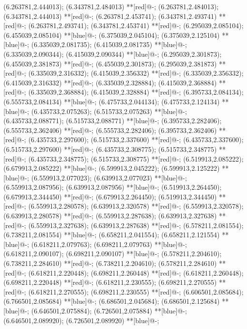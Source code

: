 (6.263781,2.444013); (6.343781,2.484013) **[red]@{-};
(6.263781,2.484013); (6.343781,2.444013) **[red]@{-};
(6.263781,2.453741); (6.343781,2.493741) **[red]@{-};
(6.263781,2.493741); (6.343781,2.453741) **[red]@{-};
(6.295039,2.085104); (6.455039,2.085104) **[blue]@{-};
(6.375039,2.045104); (6.375039,2.125104) **[blue]@{-};
(6.335039,2.081735); (6.415039,2.081735) **[blue]@{-};
(6.335039,2.090344); (6.415039,2.090344) **[blue]@{-};
(6.295039,2.301873); (6.455039,2.381873) **[red]@{-};
(6.455039,2.301873); (6.295039,2.381873) **[red]@{-};
(6.335039,2.316332); (6.415039,2.356332) **[red]@{-};
(6.335039,2.356332); (6.415039,2.316332) **[red]@{-};
(6.335039,2.328884); (6.415039,2.368884) **[red]@{-};
(6.335039,2.368884); (6.415039,2.328884) **[red]@{-};
(6.395733,2.084134); (6.555733,2.084134) **[blue]@{-};
(6.475733,2.044134); (6.475733,2.124134) **[blue]@{-};
(6.435733,2.075263); (6.515733,2.075263) **[blue]@{-};
(6.435733,2.088771); (6.515733,2.088771) **[blue]@{-};
(6.395733,2.282406); (6.555733,2.362406) **[red]@{-};
(6.555733,2.282406); (6.395733,2.362406) **[red]@{-};
(6.435733,2.297600); (6.515733,2.337600) **[red]@{-};
(6.435733,2.337600); (6.515733,2.297600) **[red]@{-};
(6.435733,2.308775); (6.515733,2.348775) **[red]@{-};
(6.435733,2.348775); (6.515733,2.308775) **[red]@{-};
(6.519913,2.085222); (6.679913,2.085222) **[blue]@{-};
(6.599913,2.045222); (6.599913,2.125222) **[blue]@{-};
(6.559913,2.077023); (6.639913,2.077023) **[blue]@{-};
(6.559913,2.087956); (6.639913,2.087956) **[blue]@{-};
(6.519913,2.264450); (6.679913,2.344450) **[red]@{-};
(6.679913,2.264450); (6.519913,2.344450) **[red]@{-};
(6.559913,2.280578); (6.639913,2.320578) **[red]@{-};
(6.559913,2.320578); (6.639913,2.280578) **[red]@{-};
(6.559913,2.287638); (6.639913,2.327638) **[red]@{-};
(6.559913,2.327638); (6.639913,2.287638) **[red]@{-};
(6.578211,2.081554); (6.738211,2.081554) **[blue]@{-};
(6.658211,2.041554); (6.658211,2.121554) **[blue]@{-};
(6.618211,2.079763); (6.698211,2.079763) **[blue]@{-};
(6.618211,2.090107); (6.698211,2.090107) **[blue]@{-};
(6.578211,2.204610); (6.738211,2.284610) **[red]@{-};
(6.738211,2.204610); (6.578211,2.284610) **[red]@{-};
(6.618211,2.220448); (6.698211,2.260448) **[red]@{-};
(6.618211,2.260448); (6.698211,2.220448) **[red]@{-};
(6.618211,2.230555); (6.698211,2.270555) **[red]@{-};
(6.618211,2.270555); (6.698211,2.230555) **[red]@{-};
(6.606501,2.085684); (6.766501,2.085684) **[blue]@{-};
(6.686501,2.045684); (6.686501,2.125684) **[blue]@{-};
(6.646501,2.075884); (6.726501,2.075884) **[blue]@{-};
(6.646501,2.089920); (6.726501,2.089920) **[blue]@{-};
